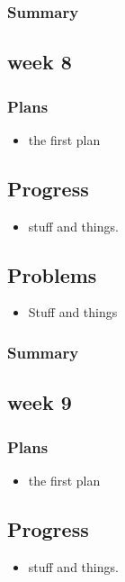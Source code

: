 \documentclass[onecolumn, draftclsnofoot,10pt, compsoc]{article}
\begin{document}
			\subsubsection{Summary}
			
		\subsection{week 8}
			\subsubsection{Plans}
				\begin{itemize}
					\item the first plan
				\end{itemize}
			\subsection{Progress}
				\begin{itemize}
					\item stuff and things.
				\end{itemize}
			\subsection{Problems}
				\begin{itemize}
					\item Stuff and things
				\end{itemize}
			\subsubsection{Summary}
			
		\subsection{week 9}
			\subsubsection{Plans}
				\begin{itemize}
					\item the first plan
				\end{itemize}
			\subsection{Progress}
				\begin{itemize}
					\item stuff and things.
				\end{itemize}
\end{document}
